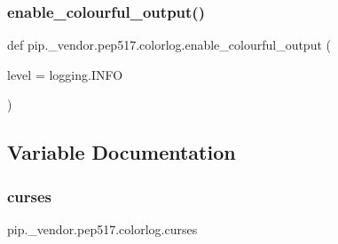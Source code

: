 \subsubsection{\texorpdfstring{enable\+\_\+colourful\+\_\+output()}{enable\_colourful\_output()}}
{\footnotesize\ttfamily def pip.\+\_\+vendor.\+pep517.\+colorlog.\+enable\+\_\+colourful\+\_\+output (\begin{DoxyParamCaption}\item[{}]{level = {\ttfamily logging.INFO} }\end{DoxyParamCaption})}



\subsection{Variable Documentation}
\mbox{\label{namespacepip_1_1__vendor_1_1pep517_1_1colorlog_a93b8906ebc83c75adcf63beb6c95d506}} 
\subsubsection{\texorpdfstring{curses}{curses}}
{\footnotesize\ttfamily pip.\+\_\+vendor.\+pep517.\+colorlog.\+curses}

